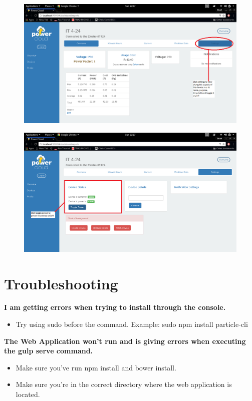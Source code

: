 \documentclass[a4paper,10pt]{article}
\begin{document}
	\begin{figure}[H]
		\includegraphics[scale=0.3]{images/settings1.png}
	\end{figure}
	
	\begin{figure}[H]
		\includegraphics[scale=0.3]{images/settings.png}
	\end{figure}
	
	\newpage
	\section{Troubleshooting}
	\textbf{I am getting errors when trying to install through the console.}
	\begin{itemize}
		\item Try using sudo before the command. Example: sudo npm install particle-cli
	\end{itemize}
	
	\textbf{The Web Application won't run and is giving errors when executing the gulp serve command.} 
	\begin{itemize}
		\item Make sure you've run npm install and bower install.
		\item Make sure you're in the correct directory where the web application is located.
	\end{itemize}
\end{document}
